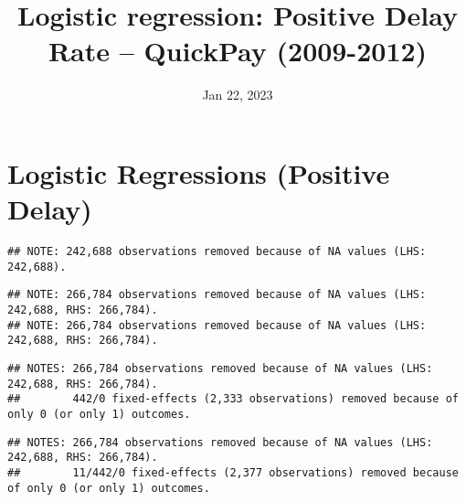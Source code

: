 \documentclass[
]{article}
\title{Logistic regression: Positive Delay Rate -- QuickPay (2009-2012)}
\author{}
\date{\vspace{-2.5em}Jan 22, 2023}
\begin{document}
\maketitle

\hypertarget{logistic-regressions-positive-delay}{%
\section{Logistic Regressions (Positive
Delay)}\label{logistic-regressions-positive-delay}}

\begin{verbatim}
## NOTE: 242,688 observations removed because of NA values (LHS: 242,688).
\end{verbatim}

\begin{verbatim}
## NOTE: 266,784 observations removed because of NA values (LHS: 242,688, RHS: 266,784).
## NOTE: 266,784 observations removed because of NA values (LHS: 242,688, RHS: 266,784).
\end{verbatim}

\begin{verbatim}
## NOTES: 266,784 observations removed because of NA values (LHS: 242,688, RHS: 266,784).
##        442/0 fixed-effects (2,333 observations) removed because of only 0 (or only 1) outcomes.
\end{verbatim}

\begin{verbatim}
## NOTES: 266,784 observations removed because of NA values (LHS: 242,688, RHS: 266,784).
##        11/442/0 fixed-effects (2,377 observations) removed because of only 0 (or only 1) outcomes.
\end{verbatim}
\end{document}
